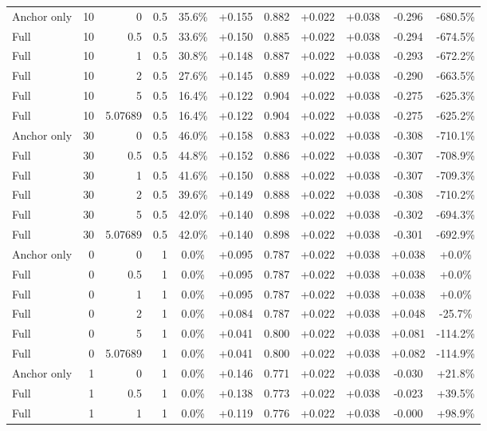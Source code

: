 \begin{table}[htbp]
\begin{tabular}{lrrrccccccc}
Anchor only & 10 & 0 & 0.5 & 35.6\% & +0.155 & 0.882 & +0.022 & +0.038 & -0.296 & -680.5\% \\
Full & 10 & 0.5 & 0.5 & 33.6\% & +0.150 & 0.885 & +0.022 & +0.038 & -0.294 & -674.5\% \\
Full & 10 & 1 & 0.5 & 30.8\% & +0.148 & 0.887 & +0.022 & +0.038 & -0.293 & -672.2\% \\
Full & 10 & 2 & 0.5 & 27.6\% & +0.145 & 0.889 & +0.022 & +0.038 & -0.290 & -663.5\% \\
Full & 10 & 5 & 0.5 & 16.4\% & +0.122 & 0.904 & +0.022 & +0.038 & -0.275 & -625.3\% \\
Full & 10 & 5.07689 & 0.5 & 16.4\% & +0.122 & 0.904 & +0.022 & +0.038 & -0.275 & -625.2\% \\
Anchor only & 30 & 0 & 0.5 & 46.0\% & +0.158 & 0.883 & +0.022 & +0.038 & -0.308 & -710.1\% \\
Full & 30 & 0.5 & 0.5 & 44.8\% & +0.152 & 0.886 & +0.022 & +0.038 & -0.307 & -708.9\% \\
Full & 30 & 1 & 0.5 & 41.6\% & +0.150 & 0.888 & +0.022 & +0.038 & -0.307 & -709.3\% \\
Full & 30 & 2 & 0.5 & 39.6\% & +0.149 & 0.888 & +0.022 & +0.038 & -0.308 & -710.2\% \\
Full & 30 & 5 & 0.5 & 42.0\% & +0.140 & 0.898 & +0.022 & +0.038 & -0.302 & -694.3\% \\
Full & 30 & 5.07689 & 0.5 & 42.0\% & +0.140 & 0.898 & +0.022 & +0.038 & -0.301 & -692.9\% \\
Anchor only & 0 & 0 & 1 & 0.0\% & +0.095 & 0.787 & +0.022 & +0.038 & +0.038 & +0.0\% \\
Full & 0 & 0.5 & 1 & 0.0\% & +0.095 & 0.787 & +0.022 & +0.038 & +0.038 & +0.0\% \\
Full & 0 & 1 & 1 & 0.0\% & +0.095 & 0.787 & +0.022 & +0.038 & +0.038 & +0.0\% \\
Full & 0 & 2 & 1 & 0.0\% & +0.084 & 0.787 & +0.022 & +0.038 & +0.048 & -25.7\% \\
Full & 0 & 5 & 1 & 0.0\% & +0.041 & 0.800 & +0.022 & +0.038 & +0.081 & -114.2\% \\
Full & 0 & 5.07689 & 1 & 0.0\% & +0.041 & 0.800 & +0.022 & +0.038 & +0.082 & -114.9\% \\
Anchor only & 1 & 0 & 1 & 0.0\% & +0.146 & 0.771 & +0.022 & +0.038 & -0.030 & +21.8\% \\
Full & 1 & 0.5 & 1 & 0.0\% & +0.138 & 0.773 & +0.022 & +0.038 & -0.023 & +39.5\% \\
Full & 1 & 1 & 1 & 0.0\% & +0.119 & 0.776 & +0.022 & +0.038 & -0.000 & +98.9\% \\

\end{tabular}
\end{table}
